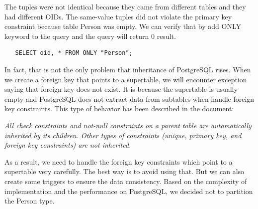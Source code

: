 \documentclass[11pt]{article}
\begin{document}
\par
The tuples were not identical because they came from different tables and they had different OIDs. The same-value tuples did not violate the primary key constraint because table Person was empty. We can verify that by add ONLY keyword to the query and the query will return 0 result.
\begin{verbatim}
   SELECT oid, * FROM ONLY "Person";
\end{verbatim}

\par
In fact, that is not the only problem that inheritance of PostgreSQL rises. When we create a foreign key that points to a supertable, we will encounter exception saying that foreign key does not exist. It is because the supertable is usually empty and PostgreSQL does not extract data from subtables when handle foreign key constraints. This type of behavior has been described in the document:
\par
\emph{All check constraints and not-null constraints on a parent table are automatically inherited by its children. Other types of constraints (unique, primary key, and foreign key constraints) are not inherited.}
\par
As a result, we need to handle the foreign key constraints which point to a supertable very carefully. The best way is to avoid using that. But we can also create some triggers to ensure the data consistency. Based on the complexity of implementation and the performance on PostgreSQL, we decided not to partition the Person type.
\end{document}

